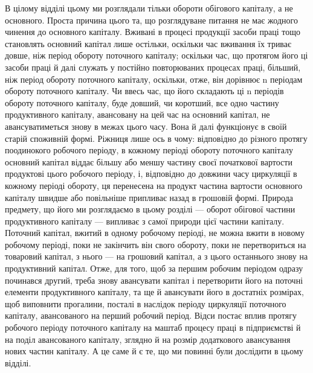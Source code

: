 В цілому відділі цьому ми розглядали тільки обороти обігового капіталу,
а не основного. Проста причина цього та, що розглядуване питання
не має жодного чинення до основного капіталу. Вживані в процесі продукції
засоби праці тощо становлять основний капітал лише остільки,
оскільки час вживання їх триває довше, ніж період обороту поточного
капіталу; оскільки час, що протягом його ці засоби праці й далі служать
у постійно повторюваних процесах праці, більший, ніж період обороту
поточного капіталу, оскільки, отже, він дорівнює n періодам обороту
поточного капіталу. Чи ввесь час, що його складають ці n періодів обороту
поточного капіталу, буде довший, чи коротший, все одно частину
продуктивного капіталу, авансовану на цей час на основний капітал, не
авансуватиметься знову в межах цього часу. Вона й далі функціонує в
своїй старій споживній формі. Ріжниця лише ось в чому: відповідно до
різного протягу поодинокого робочого періоду, в кожному періоді
обороту поточного капіталу основний капітал віддає більшу або меншу
частину своєї початкової вартости продуктові цього робочого періоду, і,
відповідно до довжини часу циркуляції в кожному періоді обороту, ця
перенесена на продукт частина вартости основного капіталу швидше або
повільніше припливає назад в грошовій формі. Природа предмету, що
його ми розглядаємо в цьому розділі — оборот обігової частини продуктивного
капіталу — випливає з самої природи цієї частини капіталу. Поточний
капітал, вжитий в одному робочому періоді, не можна вжити в
новому робочому періоді, поки не закінчить він свого обороту, поки не
перетвориться на товаровий капітал, з нього — на грошовий капітал, а
з цього останнього знову на продуктивний капітал. Отже, для того, щоб
за першим робочим періодом одразу починався другий, треба знову
авансувати капітал і перетворити його на поточні елементи продуктивного
капіталу, та ще й авансувати його в достатніх розмірах, щоб виповнити
прогалини, посталі в наслідок періоду циркуляції поточного
капіталу, авансованого на перший робочий період. Відси постає вплив
протягу робочого періоду поточного капіталу на маштаб процесу праці
в підприємстві й на поділ авансованого капіталу, зглядно й на розмір
додаткового авансування нових частин капіталу. А це саме й є те, що ми
повинні були дослідити в цьому відділі.
